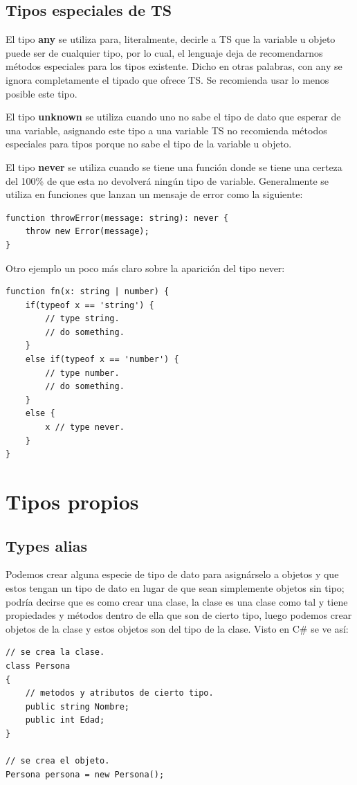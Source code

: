 \subsection{Tipos especiales de TS}

El tipo \textbf{any} se utiliza para, literalmente, decirle a TS que la variable u objeto puede ser de cualquier tipo, por lo cual, el lenguaje deja de recomendarnos métodos especiales para los tipos existente. Dicho en otras palabras, con any se ignora completamente el tipado que ofrece TS. Se recomienda usar lo menos posible este tipo.

El tipo \textbf{unknown} se utiliza cuando uno no sabe el tipo de dato que esperar de una variable, asignando este tipo a una variable TS no recomienda métodos especiales para tipos porque no sabe el tipo de la variable u objeto.

El tipo \textbf{never} se utiliza cuando se tiene una función donde se tiene una certeza del 100\% de que esta no devolverá ningún tipo de variable. Generalmente se utiliza en funciones que lanzan un mensaje de error como la siguiente:
\begin{lstlisting}
function throwError(message: string): never {
    throw new Error(message);
}
\end{lstlisting}

Otro ejemplo un poco más claro sobre la aparición del tipo never:
\begin{lstlisting}
function fn(x: string | number) {
    if(typeof x == 'string') {
        // type string.
        // do something.
    }
    else if(typeof x == 'number') {
        // type number.
        // do something.
    }
    else {
        x // type never.
    }
}
\end{lstlisting}



\section{Tipos propios}


\subsection{Types alias}

Podemos crear alguna especie de tipo de dato para asignárselo a objetos y que estos tengan un tipo de dato en lugar de que sean simplemente objetos sin tipo; podría decirse que es como crear una clase, la clase es una clase como tal y tiene propiedades y métodos dentro de ella que son de cierto tipo, luego podemos crear objetos de la clase y estos objetos son del tipo de la clase. Visto en C\# se ve así:
\begin{lstlisting}
// se crea la clase.
class Persona
{
    // metodos y atributos de cierto tipo.
    public string Nombre;
    public int Edad;
}

// se crea el objeto.
Persona persona = new Persona();
\end{lstlisting}

